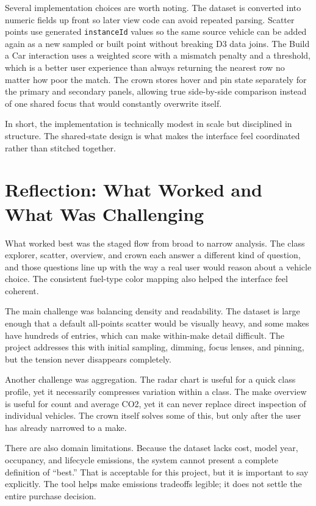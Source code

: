\documentclass[12pt,letterpaper]{article}
\begin{document}
Several implementation choices are worth noting. The dataset is converted into numeric fields up front so later view code can avoid repeated parsing. Scatter points use generated \texttt{instanceId} values so the same source vehicle can be added again as a new sampled or built point without breaking D3 data joins. The Build a Car interaction uses a weighted score with a mismatch penalty and a threshold, which is a better user experience than always returning the nearest row no matter how poor the match. The crown stores hover and pin state separately for the primary and secondary panels, allowing true side-by-side comparison instead of one shared focus that would constantly overwrite itself.

In short, the implementation is technically modest in scale but disciplined in structure. The shared-state design is what makes the interface feel coordinated rather than stitched together.

\section{Reflection: What Worked and What Was Challenging}
What worked best was the staged flow from broad to narrow analysis. The class explorer, scatter, overview, and crown each answer a different kind of question, and those questions line up with the way a real user would reason about a vehicle choice. The consistent fuel-type color mapping also helped the interface feel coherent.

The main challenge was balancing density and readability. The dataset is large enough that a default all-points scatter would be visually heavy, and some makes have hundreds of entries, which can make within-make detail difficult. The project addresses this with initial sampling, dimming, focus lenses, and pinning, but the tension never disappears completely.

Another challenge was aggregation. The radar chart is useful for a quick class profile, yet it necessarily compresses variation within a class. The make overview is useful for count and average CO2, yet it can never replace direct inspection of individual vehicles. The crown itself solves some of this, but only after the user has already narrowed to a make.

There are also domain limitations. Because the dataset lacks cost, model year, occupancy, and lifecycle emissions, the system cannot present a complete definition of ``best.'' That is acceptable for this project, but it is important to say explicitly. The tool helps make emissions tradeoffs legible; it does not settle the entire purchase decision.
\end{document}

